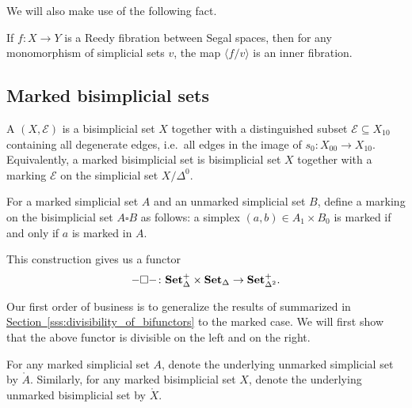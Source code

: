 \documentclass[main.tex]{subfiles}
\begin{document}
We will also make use of the following fact.

\begin{theorem}
  \label{thm:inner_fibration_between_quasicategories}
  If $f\colon X \to Y$ is a Reedy fibration between Segal spaces, then for any monomorphism of simplicial sets $v$, the map $\langle f / v \rangle$ is an inner fibration.
\end{theorem}


\subsection{Marked bisimplicial sets}
\label{ssc:marked_bisimplicial_sets}

\begin{definition}
  A  $(X, \mathcal{E})$ is a bisimplicial set $X$ together with a distinguished subset $\mathcal{E} \subseteq X_{10}$ containing all degenerate edges, i.e.\ all edges in the image of $s_{0}\colon X_{00} \to X_{10}$. Equivalently, a marked bisimplicial set is bisimplicial set $X$ together with a marking $\mathcal{E}$ on the simplicial set $X / \Delta^{0}$.
\end{definition}

\begin{definition}
  For a marked simplicial set $A$ and an unmarked simplicial set $B$, define a marking on the bisimplicial set $A \square B$ as follows: a simplex $(a, b) \in A_{1} \times B_{0}$ is marked if and only if $a$ is marked in $A$.
\end{definition}

This construction gives us a functor
\begin{equation*}
  - \square -  \colon \mathbf{Set}_{\Delta}^{+} \times \mathbf{Set}_{\Delta} \to \mathbf{Set}_{\Delta^{2}}^{+}.
\end{equation*}

Our first order of business is to generalize the results of \cite{qcats_vs_segal_spaces} summarized in \hyperref[sss:divisibility_of_bifunctors]{Section~\ref*{sss:divisibility_of_bifunctors}} to the marked case. We will first show that the above functor is divisible on the left and on the right.

\begin{notation}
  For any marked simplicial set $A$, denote the underlying unmarked simplicial set by $\mathring{A}$. Similarly, for any marked bisimplicial set $X$, denote the underlying unmarked bisimplicial set by $\mathring{X}$.
\end{notation}
\end{document}
